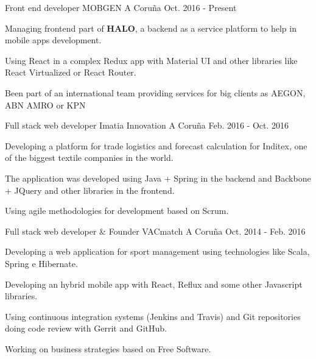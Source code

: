 


\begin{cventries}


\cventry
{Front end developer} %
{MOBGEN} %
{A Coruña} %
{Oct. 2016 - Present} %
{ %
\begin{cvitems}
\item {Managing frontend part of \textbf{HALO}, a backend as a service
platform to help in mobile apps development.}
\item {Using React in a complex Redux app with Material UI and other libraries 
like React Virtualized or React Router.}
\item {Been part of an international team providing services for big clients as 
AEGON, ABN AMRO or KPN}
\end{cvitems}
}

\cventry
{Full stack web developer} %
{Imatia Innovation} %
{A Coruña} %
{Feb. 2016 - Oct. 2016} %
{ %
\begin{cvitems}
\item {Developing a platform for trade logistics and forecast 
calculation for Inditex, one of the biggest textile companies in the world.}
\item {The application was developed using Java + Spring in the backend and
Backbone + JQuery and other libraries in the frontend.}
\item {Using agile methodologies for development based on Scrum.}
\end{cvitems}
}

\cventry
{Full stack web developer \& Founder} %
{VACmatch} %
{A Coruña} %
{Oct. 2014 - Feb. 2016} %
{ %
\begin{cvitems}
\item {Developing a web application for sport management using 
technologies like Scala, Spring e Hibernate.}
\item {Developing an hybrid mobile app with React, Reflux and some other 
Javascript libraries.}
\item {Using continuous integration systems (Jenkins and Travis) and Git 
repositories doing code review with Gerrit and GitHub.}
\item {Working on business strategies based on Free Software.}
\end{cvitems}
}



\end{cventries}
